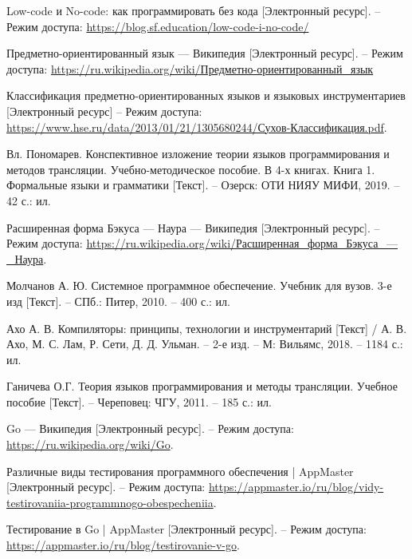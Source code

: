 \newpage


\begin{references}
	
	\item\label{ref:nolowcode} Low-code и No-code: как программировать без кода [Электронный ресурс]. --
	Режим доступа: \url{https://blog.sf.education/low-code-i-no-code/}
	
	\item\label{ref:dsl} Предметно-ориентированный язык — Википедия [Электронный ресурс]. --
	Режим доступа: \url{https://ru.wikipedia.org/wiki/Предметно-ориентированный_язык}
	
	\item\label{ref:dsl_classification} Классификация предметно-ориентированных языков и языковых инструментариев [Электронный ресурс] --
	Режим доступа: \url{https://www.hse.ru/data/2013/01/21/1305680244/Сухов-Классификация.pdf}.

	\item\label{ref:grammar} Вл. Пономарев. Конспективное изложение теории языков программирования и методов трансляции.
	Учебно-методическое пособие. В 4-х книгах. Книга 1.
	Формальные языки и грамматики [Текст]. -- Озерск: ОТИ НИЯУ МИФИ, 2019. -- 42 с.: ил.

	\item\label{ref:rbnf} Расширенная форма Бэкуса — Наура — Википедия [Электронный ресурс]. --
	Режим доступа: \url{https://ru.wikipedia.org/wiki/Расширенная_форма_Бэкуса_—_Наура}.

	\item\label{ref:lexlem} Молчанов А. Ю. Системное программное обеспечение.
	Учебник для вузов. 3-е изд [Текст]. -- СПб.: Питер, 2010. -- 400 с.: ил.

	\item\label{ref:dragon} Ахо А. В. Компиляторы: принципы, технологии и инструментарий [Текст] /
	А. В. Ахо, М. С. Лам, Р. Сети, Д. Д. Ульман. -- 2-е изд. -- М: Вильямс, 2018. -- 1184 с.: ил.

	\item\label{ref:ganicheva} Ганичева О.Г. Теория языков программирования и методы трансляции.
	Учебное пособие [Текст]. -- Череповец: ЧГУ, 2011. -- 185 с.: ил.

	\item\label{ref:golang} Go — Википедия [Электронный ресурс]. --
	Режим доступа: \url{https://ru.wikipedia.org/wiki/Go}.

	\item\label{ref:testing} Различные виды тестирования программного обеспечения | AppMaster [Электронный ресурс]. --
	Режим доступа: \url{https://appmaster.io/ru/blog/vidy-testirovaniia-programmnogo-obespecheniia}.

	\item\label{ref:go-testing} Тестирование в Go | AppMaster [Электронный ресурс]. --
	Режим доступа: \url{https://appmaster.io/ru/blog/testirovanie-v-go}.

	\label{ref:total}
\end{references}
